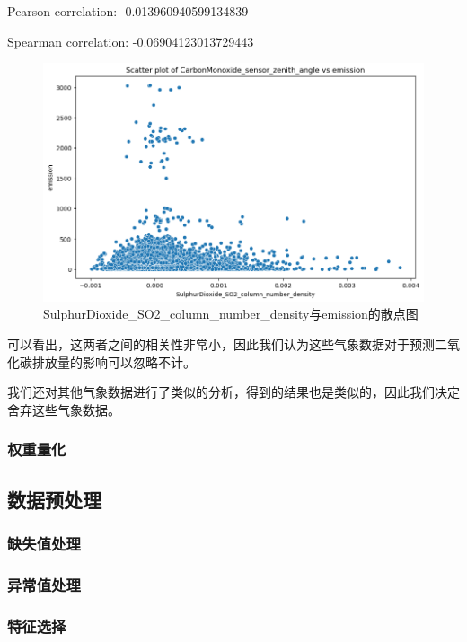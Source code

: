 \documentclass[fontset=windows]{article}
\begin{document}
\begin{center}
Pearson correlation: -0.013960940599134839

Spearman correlation: -0.06904123013729443
\end{center}


\begin{figure}[H]
      \centering
      \includegraphics[width=1\textwidth]{output1.png}
      \caption{SulphurDioxide\_SO2\_column\_number\_density与emission的散点图}
\end{figure}

可以看出，这两者之间的相关性非常小，因此我们认为这些气象数据对于预测二氧化碳排放量的影响可以忽略不计。

我们还对其他气象数据进行了类似的分析，得到的结果也是类似的，因此我们决定舍弃这些气象数据。

\subsubsection{权重量化}


\subsection{数据预处理}

\subsubsection{缺失值处理}

\subsubsection{异常值处理}

\subsubsection{特征选择}
\end{document}
